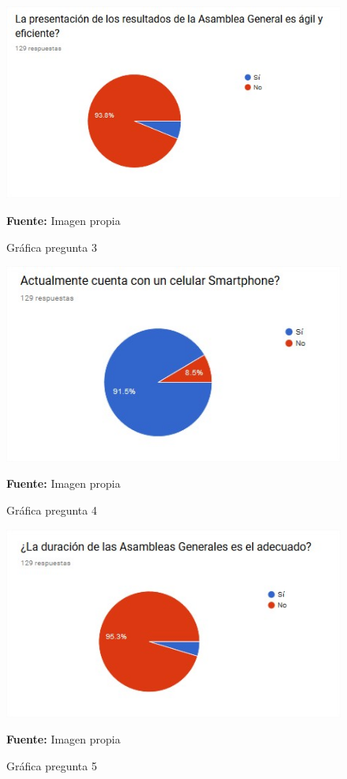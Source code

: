 \begin{figure}[th!]
	\centering
	\includegraphics[width=0.7\linewidth]{desarrollo/resultados/imgs/pregunta-3}
	\caption{Gráfica pregunta 3}{\scriptsize \textbf{Fuente:} Imagen propia}
\end{figure}


\begin{figure}[th!]
	\centering
	\includegraphics[width=0.7\linewidth]{desarrollo/resultados/imgs/pregunta-4}
	\caption{Gráfica pregunta 4}{\scriptsize \textbf{Fuente:} Imagen propia}
\end{figure}


\begin{figure}[th!]
	\centering
	\includegraphics[width=0.7\linewidth]{desarrollo/resultados/imgs/pregunta-5}
	\caption{Gráfica pregunta 5}{\scriptsize \textbf{Fuente:} Imagen propia}
\end{figure}

